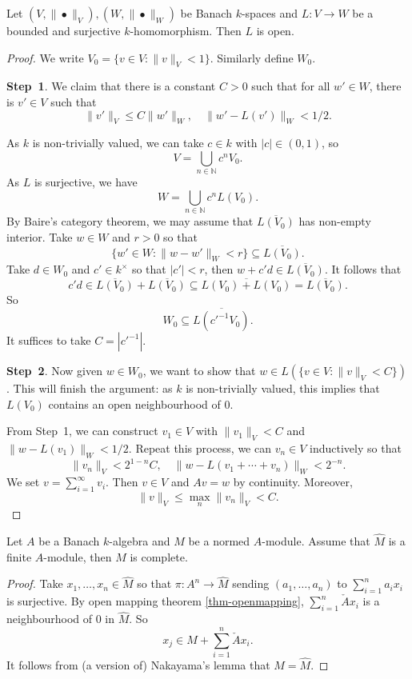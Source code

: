 \begin{thm}\label{thm-openmapping}
    Let $(V,\|\bullet\|_V), (W,\|\bullet\|_W)$ be Banach $k$-spaces and $L:V\rightarrow W$ be a bounded and surjective $k$-homomorphism. Then $L$ is open.   
\end{thm}
\begin{proof}
    We write $V_0=\{v\in V:\|v\|_V<1\}$. Similarly define $W_0$.

    \textbf{Step~1}. We claim that there is a constant $C>0$ such that for all $w'\in W$, there is $v'\in V$ such that 
    \[
        \|v'\|_V\leq  C \|w'\|_W,\quad \|w'-L(v')\|_W<1/2.
    \]

    As $k$ is non-trivially valued, we can take $c\in k$ with $|c|\in (0,1)$, so 
    \[
        V=\bigcup_{n\in \mathbb{N}} c^n V_0.  
    \]
    As $L$ is surjective, we have
    \[
        W=\bigcup_{n\in \mathbb{N}} c^n L(V_0).   
    \]
    By Baire's category theorem, we may assume that $\overline{L(V_0)}$ has non-empty interior. Take $w\in W$ and $r>0$ so that
    \[
        \{w'\in W: \|w-w'\|_W<r\}\subseteq    \overline{L(V_0)}.
    \]
    Take $d\in W_0$ and $c'\in k^{\times}$ so that $|c'|<r$, then $w+c'd\in \overline{L(V_0)}$. It follows that
    \[
        c'd\in   \overline{L(V_0)}+\overline{L(V_0)}\subseteq \overline{L(V_0)+L(V_0)}=\overline{L(V_0)}.
    \]
    So
    \[
        W_0\subseteq  \overline{L(c'^{-1}V_0)}. 
    \]
    It suffices to take $C=|c'^{-1}|$.

    \textbf{Step~2}.
    Now given $w\in W_0$, we want to show that $w\in L(\{v\in V:\|v\|_V<C\})$. 
    This will finish the argument: as $k$ is non-trivially valued, this implies that $L(V_0)$ contains an open neighbourhood of $0$. 
    
    From Step~1, we can construct $v_1\in V$ with $\|v_1\|_V< C$ and $\|w-L(v_1)\|_W<1/2$. Repeat this process, we can $v_n\in V$ inductively so that
    \[
        \|v_n\|_V<  2^{1-n} C,\quad \|w-L(v_1+\cdots+v_n)\|_W<2^{-n}.
    \]
    We set $v=\sum_{i=1}^{\infty} v_i$. Then $v\in V$ and $Av=w$ by continuity. Moreover,
    \[
        \|v\|_V\leq \max_n \|v_n\|_V<C.   
    \]
\end{proof}


\begin{corollary}\label{cor-completionfinitecomplete}
    Let $A$ be a Banach $k$-algebra and $M$ be a normed $A$-module. Assume that $\hat{M}$ is a finite $A$-module, then $M$ is complete.
\end{corollary}
\begin{proof}
    Take $x_1,\ldots,x_n\in \hat{M}$ so that $\pi:A^n\rightarrow \hat{M}$ sending $(a_1,\ldots,a_n)$ to $\sum_{i=1}^n a_ix_i$ is surjective. By open mapping theorem \cref{thm-openmapping}, $\sum_{i=1}^n \check{A}x_i$ is a neighbourhood of $0$ in $\hat{M}$. So
    \[
        x_j\in M+  \sum_{i=1}^n \check{A} x_i.
    \]
    It follows from (a version of) Nakayama's lemma that $M=\hat{M}$.
\end{proof}

